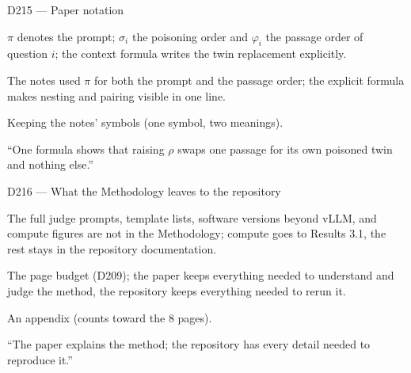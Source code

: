 \documentclass[11pt,a4paper]{report}
\begin{document}
\begin{decisionbox}{D215 --- Paper notation}
\begin{description}[nosep, leftmargin=0pt]
  \item[Decision.] $\pi$ denotes the prompt; $\sigma_i$ the poisoning order and $\varphi_i$ the passage order of question $i$; the context formula writes the twin replacement explicitly.
  \item[Why.] The notes used $\pi$ for both the prompt and the passage order; the explicit formula makes nesting and pairing visible in one line.
  \item[Alternatives.] Keeping the notes' symbols (one symbol, two meanings).
  \item[Interview line.] ``One formula shows that raising $\rho$ swaps one passage for its own poisoned twin and nothing else.''
\end{description}
\end{decisionbox}

\begin{decisionbox}{D216 --- What the Methodology leaves to the repository}
\begin{description}[nosep, leftmargin=0pt]
  \item[Decision.] The full judge prompts, template lists, software versions beyond vLLM, and compute figures are not in the Methodology; compute goes to Results 3.1, the rest stays in the repository documentation.
  \item[Why.] The page budget (D209); the paper keeps everything needed to understand and judge the method, the repository keeps everything needed to rerun it.
  \item[Alternatives.] An appendix (counts toward the 8 pages).
  \item[Interview line.] ``The paper explains the method; the repository has every detail needed to reproduce it.''
\end{description}
\end{decisionbox}
\end{document}
